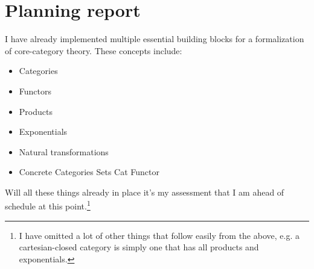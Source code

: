 \chapter{Planning report}
%
I have already implemented multiple essential building blocks for a
formalization of core-category theory. These concepts include:
%
\begin{itemize}
\item
Categories
\item
Functors
\item
Products
\item
Exponentials
\item
Natural transformations
\item
Concrete Categories
\subitem
Sets
\subitem
Cat
\subitem
Functor
\end{itemize}
%
Will all these things already in place it's my assessment that I am ahead of
schedule at this point.\footnote{I have omitted a lot of other things that
  follow easily from the above, e.g. a cartesian-closed category is simply one
  that has all products and exponentials.}

